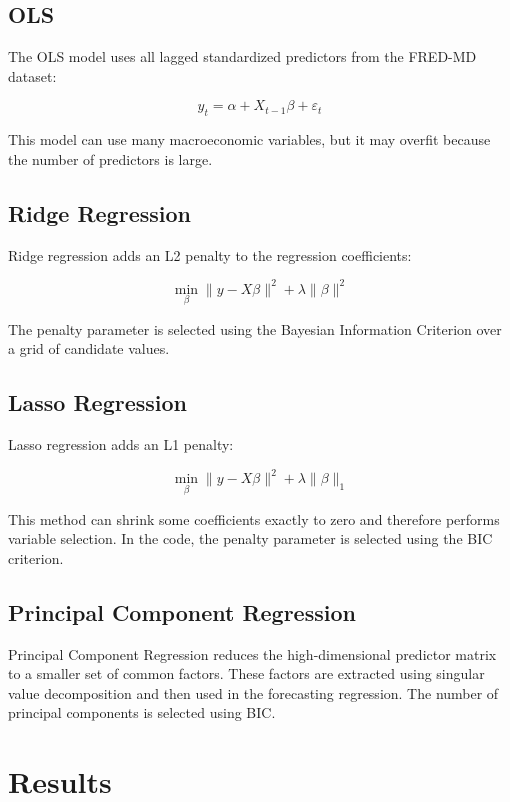 \documentclass[
  letterpaper,
  DIV=11,
  numbers=noendperiod]{scrartcl}
\begin{document}
\subsection{OLS}\label{ols}

The OLS model uses all lagged standardized predictors from the FRED-MD
dataset:

\[
y_t = \alpha + X_{t-1}\beta + \varepsilon_t
\]

This model can use many macroeconomic variables, but it may overfit
because the number of predictors is large.

\subsection{Ridge Regression}\label{ridge-regression}

Ridge regression adds an L2 penalty to the regression coefficients:

\[
\min_\beta \|y - X\beta\|^2 + \lambda \|\beta\|^2
\]

The penalty parameter is selected using the Bayesian Information
Criterion over a grid of candidate values.

\subsection{Lasso Regression}\label{lasso-regression}

Lasso regression adds an L1 penalty:

\[
\min_\beta \|y - X\beta\|^2 + \lambda \|\beta\|_1
\]

This method can shrink some coefficients exactly to zero and therefore
performs variable selection. In the code, the penalty parameter is
selected using the BIC criterion.

\subsection{Principal Component
Regression}\label{principal-component-regression}

Principal Component Regression reduces the high-dimensional predictor
matrix to a smaller set of common factors. These factors are extracted
using singular value decomposition and then used in the forecasting
regression. The number of principal components is selected using BIC.

\section{Results}\label{results}
\end{document}

